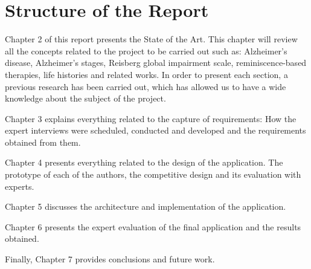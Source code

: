 \section{Structure of the Report}

Chapter 2 of this report presents the State of the Art. This chapter will review all the concepts related to the project to be carried out such as: Alzheimer's disease, Alzheimer's stages, Reisberg global impairment scale, reminiscence-based therapies, life histories and related works. In order to present each section, a previous research has been carried out, which has allowed us to have a wide knowledge about the subject of the project.
		
Chapter 3 explains everything related to the capture of requirements: How the expert interviews were scheduled, conducted and developed and the requirements obtained from them.

Chapter 4 presents everything related to the design of the application. The prototype of each of the authors, the competitive design and its evaluation with experts.

Chapter 5 discusses the architecture and implementation of the application.

Chapter 6 presents the expert evaluation of the final application and the results obtained.

Finally, Chapter 7 provides conclusions and future work.









